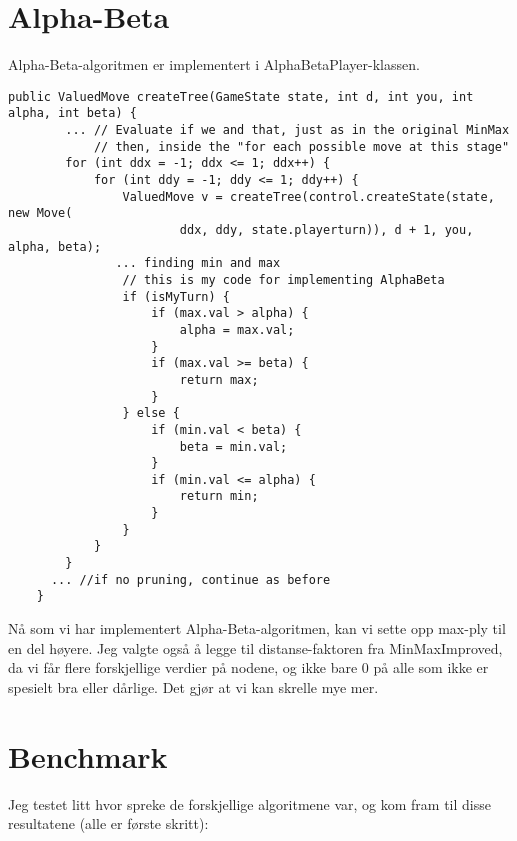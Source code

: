 \documentclass[norsk,a4paper]{article}
\begin{document}
\section{Alpha-Beta}
Alpha-Beta-algoritmen er implementert i AlphaBetaPlayer-klassen.  
\lstset{language=java}
\begin{lstlisting}
public ValuedMove createTree(GameState state, int d, int you, int alpha, int beta) {
        ... // Evaluate if we and that, just as in the original MinMax
            // then, inside the "for each possible move at this stage"
        for (int ddx = -1; ddx <= 1; ddx++) {
            for (int ddy = -1; ddy <= 1; ddy++) {
                ValuedMove v = createTree(control.createState(state, new Move(
                        ddx, ddy, state.playerturn)), d + 1, you, alpha, beta);
               ... finding min and max
                // this is my code for implementing AlphaBeta
                if (isMyTurn) {
                    if (max.val > alpha) {
                        alpha = max.val;
                    }
                    if (max.val >= beta) {
                        return max;
                    }
                } else {
                    if (min.val < beta) {
                        beta = min.val;
                    }
                    if (min.val <= alpha) {
                        return min;
                    }
                }
            }
        }
      ... //if no pruning, continue as before
    }
\end{lstlisting}

Nå som vi har implementert Alpha-Beta-algoritmen, kan vi sette opp max-ply til
en del høyere. Jeg valgte også å legge til distanse-faktoren fra MinMaxImproved,
da vi får flere forskjellige verdier på nodene, og ikke bare 0 på alle som ikke
er spesielt bra eller dårlige. Det gjør at vi kan skrelle mye mer.

\section{Benchmark}
Jeg testet litt hvor spreke de forskjellige algoritmene var, og kom fram til
disse resultatene (alle er første skritt):
\end{document}
